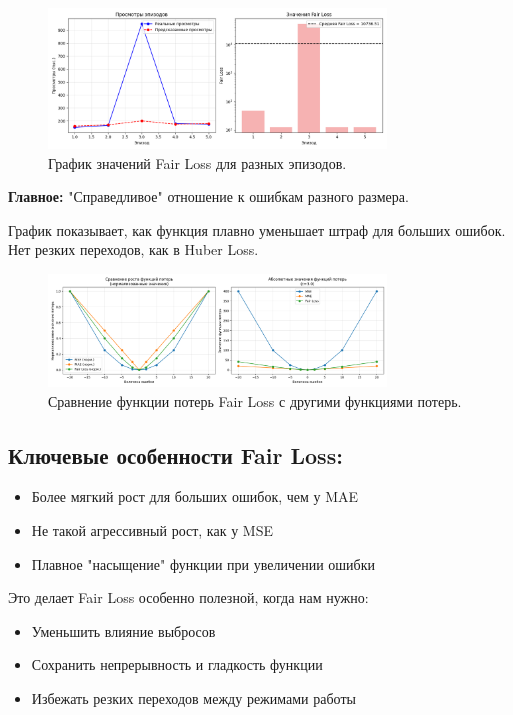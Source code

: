 \documentclass[12pt]{article}
\theoremstyle{definition}
\theoremstyle{definition}
\theoremstyle{definition}
\theoremstyle{remark}
\theoremstyle{remark}
\begin{document}
\begin{figure}[h!]
    \centering
    \includegraphics[width=0.8\textwidth]{imgs/fair.png}
    \caption{График значений Fair Loss для разных эпизодов.}
\end{figure}

\textbf{Главное:} "Справедливое" отношение к ошибкам разного размера.

График показывает, как функция плавно уменьшает штраф для больших ошибок. Нет резких переходов, как в Huber Loss.

\begin{figure}[h!]
    \centering
    \includegraphics[width=0.8\textwidth]{imgs/fair_plus.png}
    \caption{Сравнение функции потерь Fair Loss с другими функциями потерь.}
\end{figure}

\subsection*{Ключевые особенности Fair Loss:}
\begin{itemize}
    \item Более мягкий рост для больших ошибок, чем у MAE
    \item Не такой агрессивный рост, как у MSE
    \item Плавное "насыщение" функции при увеличении ошибки
\end{itemize}

Это делает Fair Loss особенно полезной, когда нам нужно:
\begin{itemize}
    \item Уменьшить влияние выбросов
    \item Сохранить непрерывность и гладкость функции
    \item Избежать резких переходов между режимами работы
\end{itemize}
\end{document}
